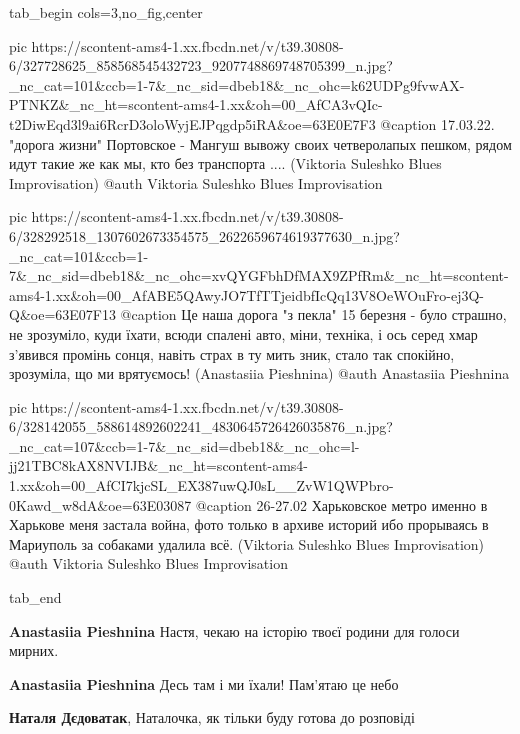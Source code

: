  
 
 
 
 


\ifcmt
  tab_begin cols=3,no_fig,center

     pic https://scontent-ams4-1.xx.fbcdn.net/v/t39.30808-6/327728625_858568545432723_9207748869748705399_n.jpg?_nc_cat=101&ccb=1-7&_nc_sid=dbeb18&_nc_ohc=k62UDPg9fvwAX-PTNKZ&_nc_ht=scontent-ams4-1.xx&oh=00_AfCA3vQIc-t2DiwEqd3l9ai6RcrD3oloWyjEJPqgdp5iRA&oe=63E0E7F3
     @caption 17.03.22. "дорога жизни" Портовское - Мангуш вывожу своих четверолапых пешком, рядом идут такие же как мы, кто без транспорта .... (Viktoria Suleshko Blues Improvisation)
     @auth Viktoria Suleshko Blues Improvisation

     pic https://scontent-ams4-1.xx.fbcdn.net/v/t39.30808-6/328292518_1307602673354575_2622659674619377630_n.jpg?_nc_cat=101&ccb=1-7&_nc_sid=dbeb18&_nc_ohc=xvQYGFbhDfMAX9ZPfRm&_nc_ht=scontent-ams4-1.xx&oh=00_AfABE5QAwyJO7TfTTjeidbfIcQq13V8OeWOuFro-ej3Q-Q&oe=63E07F13
     @caption Це наша дорога "з пекла" 15 березня - було страшно, не зрозуміло, куди їхати, всюди спалені авто, міни, техніка, і ось серед хмар з'явився промінь сонця, навіть страх в ту мить зник, стало так спокійно, зрозуміла, що ми врятуємось! (Anastasiia Pieshnina)
     @auth Anastasiia Pieshnina

     pic https://scontent-ams4-1.xx.fbcdn.net/v/t39.30808-6/328142055_588614892602241_4830645726426035876_n.jpg?_nc_cat=107&ccb=1-7&_nc_sid=dbeb18&_nc_ohc=l-jj21TBC8kAX8NVIJB&_nc_ht=scontent-ams4-1.xx&oh=00_AfCI7kjcSL_EX387uwQJ0sL__ZvW1QWPbro-0Kawd_w8dA&oe=63E03087
     @caption 26-27.02 Харьковское метро именно в Харькове меня застала война, фото только в архиве историй ибо прорываясь в Мариуполь за собаками удалила всё. (Viktoria Suleshko Blues Improvisation)
     @auth Viktoria Suleshko Blues Improvisation

  tab_end
\fi

\begin{itemize} %
\textbf{Anastasiia Pieshnina} Настя, чекаю на історію твоєї родини для голоси мирних.

\textbf{Anastasiia Pieshnina} Десь там і ми їхали! Пам'ятаю це небо🙌

\textbf{Наталя Дєдоватак}, Наталочка, як тільки буду готова до розповіді
\end{itemize} %

